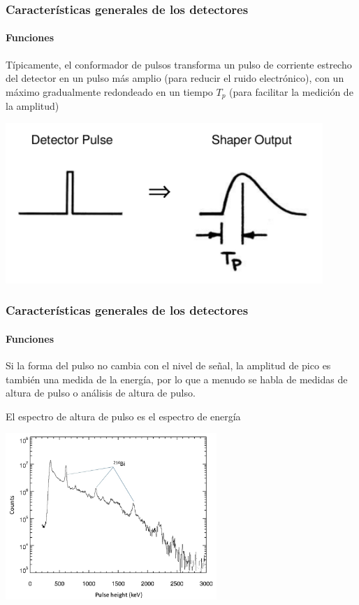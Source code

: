 \documentclass{beamer}
\begin{document}
\begin{frame}
\frametitle{Características generales de los detectores}
\framesubtitle{{\color{blue}Funciones}}
\begin{block}{}
Típicamente, el conformador de pulsos transforma un pulso de
corriente \alert{estrecho} del detector en un pulso más \alert{amplio} (para
reducir el ruido electrónico), con un máximo gradualmente redondeado en un
tiempo $T_p$ (para facilitar la medición de la amplitud)
\end{block}

\includegraphics[height=0.45\textheight,width=0.9\textwidth]{d1/det_pulse_and_shaper_out}
\end{frame} 

\begin{frame}
\frametitle{Características generales de los detectores}
\framesubtitle{{\color{blue}Funciones}}
\begin{block}{}
Si la forma del pulso no cambia con el nivel de señal, la amplitud de pico es
también una medida de la energía, por lo que a menudo se habla de \alert{medidas de
altura de pulso o análisis de altura de pulso}. 

{\color[rgb]{0.5,0,0.13}El espectro de altura de pulso es el espectro de
energía}
\end{block}

\begin{center}
\includegraphics[height=0.45\textheight,width=0.6\textwidth]{d1/pulse_height_spectrum}
\end{center}
\end{frame} 
\end{document}
